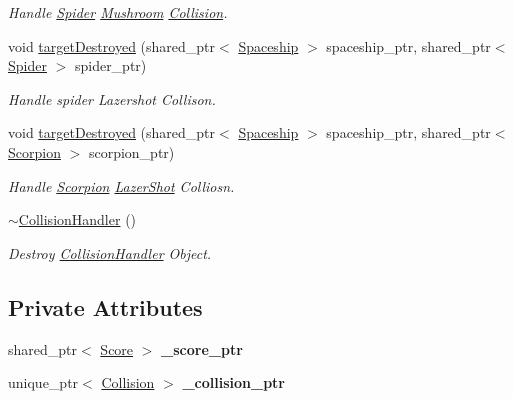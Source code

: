 \begin{DoxyCompactItemize}
\begin{DoxyCompactList}\small\item\em Handle \mbox{\hyperlink{class_spider}{Spider}} \mbox{\hyperlink{class_mushroom}{Mushroom}} \mbox{\hyperlink{class_collision}{Collision}}. \end{DoxyCompactList}\item 
void \mbox{\hyperlink{class_collision_handler_aba8e483266434721d8914aa10ae20797}{target\+Destroyed}} (shared\+\_\+ptr$<$ \mbox{\hyperlink{class_spaceship}{Spaceship}} $>$ spaceship\+\_\+ptr, shared\+\_\+ptr$<$ \mbox{\hyperlink{class_spider}{Spider}} $>$ spider\+\_\+ptr)
\begin{DoxyCompactList}\small\item\em Handle spider Lazershot Collison. \end{DoxyCompactList}\item 
void \mbox{\hyperlink{class_collision_handler_a8691ccab3aa2d3b300b8982b5c38acc3}{target\+Destroyed}} (shared\+\_\+ptr$<$ \mbox{\hyperlink{class_spaceship}{Spaceship}} $>$ spaceship\+\_\+ptr, shared\+\_\+ptr$<$ \mbox{\hyperlink{class_scorpion}{Scorpion}} $>$ scorpion\+\_\+ptr)
\begin{DoxyCompactList}\small\item\em Handle \mbox{\hyperlink{class_scorpion}{Scorpion}} \mbox{\hyperlink{class_lazer_shot}{Lazer\+Shot}} Colliosn. \end{DoxyCompactList}\item 
\mbox{\label{class_collision_handler_a99f5524cf1706f9ea95500cf273a9d97}} 
\mbox{\hyperlink{class_collision_handler_a99f5524cf1706f9ea95500cf273a9d97}{$\sim$\+Collision\+Handler}} ()
\begin{DoxyCompactList}\small\item\em Destroy \mbox{\hyperlink{class_collision_handler}{Collision\+Handler}} Object. \end{DoxyCompactList}\end{DoxyCompactItemize}
\subsection*{Private Attributes}
\begin{DoxyCompactItemize}
\item 
\mbox{\label{class_collision_handler_abe0be81527d73f773f9d388f44efc536}} 
shared\+\_\+ptr$<$ \mbox{\hyperlink{class_score}{Score}} $>$ {\bfseries \+\_\+score\+\_\+ptr}
\item 
\mbox{\label{class_collision_handler_af0c7e6de35e6c07fd9a1115c11adb478}} 
unique\+\_\+ptr$<$ \mbox{\hyperlink{class_collision}{Collision}} $>$ {\bfseries \+\_\+collision\+\_\+ptr}
\end{DoxyCompactItemize}


